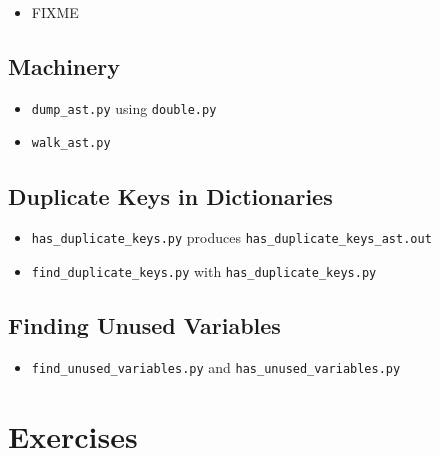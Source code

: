 \documentclass{scrbook}
\begin{document}
\begin{itemize}

\item FIXME

\end{itemize}

\section{Machinery}\label{linter-machinery}

\begin{itemize}

\item 

\texttt{dump\_ast.py} using \texttt{double.py}



\item 

\texttt{walk\_ast.py}



\end{itemize}

\section*{Duplicate Keys in Dictionaries}

\begin{itemize}

\item \texttt{has\_duplicate\_keys.py} produces \texttt{has\_duplicate\_keys\_ast.out}

\item \texttt{find\_duplicate\_keys.py} with \texttt{has\_duplicate\_keys.py}

\end{itemize}

\section*{Finding Unused Variables}

\begin{itemize}

\item \texttt{find\_unused\_variables.py} and \texttt{has\_unused\_variables.py}

\end{itemize}

\chapter{Exercises}\label{linter-exercises}
\end{document}

